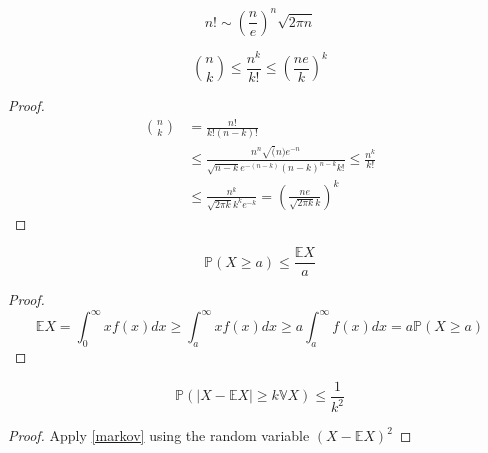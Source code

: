 \begin{theorem}\label{stirling}
	\begin{equation}
		n! \sim (\frac{n}{e})^n \sqrt{2\pi n}
	\end{equation}
\end{theorem}

\begin{corollary}\label{th:NChooseK}
	\begin{equation}
		\binom{n}{k} \leq \frac{n^k}{k!} \leq (\frac{ne}{k})^k
	\end{equation}
\end{corollary}
\begin{proof}
	\begin{align}
		\binom{n}{k} 	&= \frac{n!}{k!(n-k)!}  \\
				&\leq \frac{n^n\sqrt(n) e^{-n} }{\sqrt{n-k} e^{-(n-k)} (n-k)^{n-k} k!} \leq \frac{n^k}{k!} \\
				&\leq \frac{ n^k }{\sqrt{2\pi k} k^k e^{-k}} = (\frac{ne}{\sqrt{2\pi k} k})^k
	\end{align}
\end{proof}
	\begin{theorem}\label{markov}
	\begin{equation}
		\mathbb{P}(X \geq a) \leq \frac{\mathbb{E}X}{a}
	\end{equation}
\end{theorem}
\begin{proof}
    \begin{equation}
        \mathbb{E}X = \int_0^{\infty}x f(x)dx \geq \int_a^{\infty} xf(x)dx \geq  a\int_a^{\infty} f(x)dx =a \mathbb{P}(X\geq a)
    \end{equation}
\end{proof}


\begin{corollary}\label{cheby}
	\begin{equation}
		\mathbb{P}(|X - \mathbb{E}X| \geq k \mathbb{V}X ) \leq \frac{1}{k^2}
	\end{equation}
\end{corollary}
\begin{proof}
    Apply \eqref{markov} using the random variable $(X-\mathbb{E}X)^2$
\end{proof}
